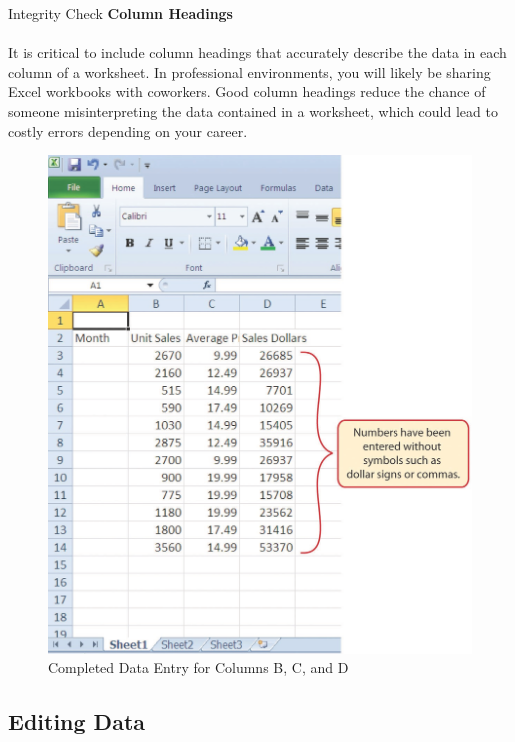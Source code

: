 \begin{center}
	\begin{infobox}{Integrity Check}
		\textbf{Column Headings}
		\\
		\\
		It is critical to include column headings that accurately describe the data in each column of a worksheet. In professional environments, you will likely be sharing Excel workbooks with coworkers. Good column headings reduce the chance of someone misinterpreting the data contained in a worksheet, which could lead to costly errors depending on your career.
	\end{infobox}
\end{center}

\begin{figure}[H]
	\centering
	\includegraphics[width=\maxwidth{.95\linewidth}]{gfx/ch01_fig16}
	\caption{Completed Data Entry for Columns B, C, and D}
	\label{01:fig16}
\end{figure}

\subsection{Editing Data}

